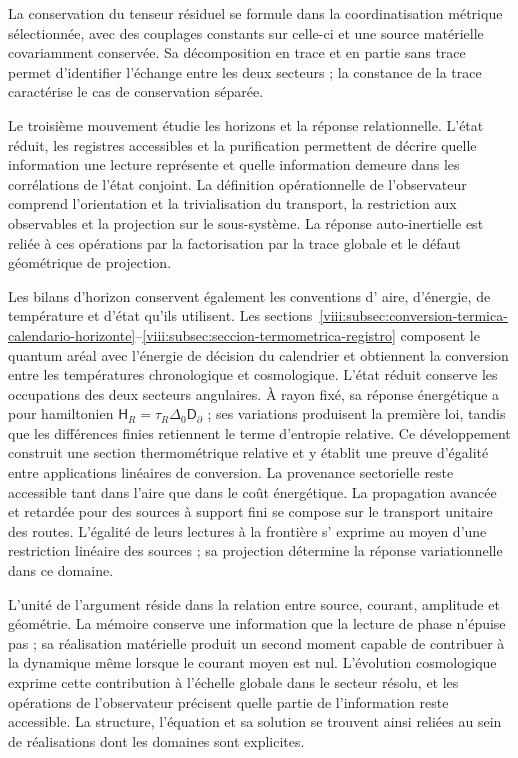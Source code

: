 La conservation du tenseur résiduel se formule dans la coordinatisation métrique sélectionnée, avec des couplages constants sur celle-ci et une source matérielle covariamment conservée. Sa décomposition en trace et en partie sans trace permet d'identifier l'échange entre les deux secteurs ; la constance de la trace caractérise le cas de conservation séparée.

Le troisième mouvement étudie les horizons et la réponse relationnelle. L'état
réduit, les registres accessibles et la purification permettent de décrire
quelle information une lecture représente et quelle information demeure dans les
corrélations de l'état conjoint. La définition opérationnelle de
l'observateur comprend l'orientation et la trivialisation du transport,
la restriction aux observables et la projection sur le sous-système. La réponse
auto-inertielle est reliée à ces opérations par la factorisation
par la trace globale et le défaut géométrique de projection.

Les bilans d'horizon conservent également les conventions d'
aire, d'énergie, de température et d'état qu'ils utilisent.
Les sections~\ref{viii:subsec:conversion-termica-calendario-horizonte}--\ref{viii:subsec:seccion-termometrica-registro}
composent le quantum aréal avec l'énergie de décision du calendrier et
obtiennent la conversion entre les températures chronologique et cosmologique.
L'état réduit conserve les occupations des deux secteurs
angulaires. À rayon fixé, sa réponse énergétique a pour hamiltonien
\(\mathsf H_R=\tau_R\Delta_0\mathsf D_\partial\) ; ses variations
produisent la première loi, tandis que les différences finies retiennent
le terme d'entropie relative. Ce développement construit une section
thermométrique relative et y établit une preuve d'égalité entre
applications linéaires de conversion. La provenance sectorielle reste
accessible tant dans l'aire que dans le coût énergétique.
La propagation avancée et retardée pour des sources à support fini se
compose sur le transport unitaire des routes. L'égalité de leurs lectures à la frontière s'
exprime au moyen d'une restriction linéaire des sources ; sa projection
détermine la réponse variationnelle dans ce domaine.

L'unité de l'argument réside dans la relation entre source, courant, amplitude et géométrie. La mémoire conserve une information que la lecture de phase n'épuise pas ; sa réalisation matérielle produit un second moment capable de contribuer à la dynamique même lorsque le courant moyen est nul. L'évolution cosmologique exprime cette contribution à l'échelle globale dans le secteur résolu, et les opérations de l'observateur précisent quelle partie de l'information reste accessible. La structure, l'équation et sa solution se trouvent ainsi reliées au sein de réalisations dont les domaines sont explicites.
